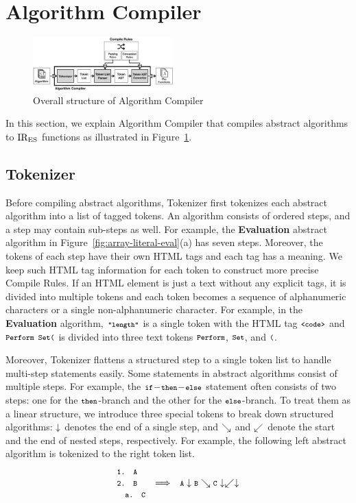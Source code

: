 \section{Algorithm Compiler}\label{sec:compiler}
\begin{figure}
  \centering
  \includegraphics[width=0.48\textwidth]{img/algo-compiler}
  \caption{Overall structure of {\sf Algorithm Compiler}}
  \label{fig:algo-compiler}
\end{figure}

In this section, we explain {\sf Algorithm Compiler} that compiles
abstract algorithms to \( \text{IR}_\text{ES} \) functions as illustrated in
Figure~\ref{fig:algo-compiler}.

\subsection{Tokenizer}
Before compiling abstract algorithms, {\sf Tokenizer} first tokenizes each
abstract algorithm into a list of tagged tokens.  An algorithm consists of
ordered steps, and a step may contain sub-steps as well.  For example, the
\textbf{\small Evaluation} abstract algorithm in
Figure~\ref{fig:array-literal-eval}(a) has seven steps.  Moreover, the tokens of
each step have their own HTML tags and each tag has a meaning.  We keep such
HTML tag information for each token to construct more precise {\sf Compile
Rules}. If an HTML element is just a text without any explicit tags, it is
divided into multiple tokens and each token becomes a sequence of alphanumeric
characters or a single non-alphanumeric character.  For example, in the
\textbf{\small Evaluation} algorithm, \( \textbf{\texttt{\footnotesize"length"}} \) is a single
token with the HTML tag \( \texttt{\footnotesize<code>} \) and \( \texttt{\footnotesize Perform Set(} \) is
divided into three text tokens \( \texttt{\footnotesize Perform} \), \( \texttt{\footnotesize Set} \), and \(
\texttt{\footnotesize(} \).

Moreover, {\sf Tokenizer} flattens a structured step to a single token
list to handle multi-step statements easily.  Some statements in
abstract algorithms consist of multiple steps.  For example, the
\( \texttt{\footnotesize if}\!-\!\texttt{\footnotesize then}\!-\!\texttt{\footnotesize else} \) statement often consists of
two steps: one for the \( \texttt{\footnotesize then} \)-branch and the other
for the \( \texttt{\footnotesize else} \)-branch.  To treat them as a linear structure,
we introduce three special tokens to break down structured algorithms:
\( \downarrow \) denotes the end of a single step, and \( \searrow \) and
\( \swarrow \) denote the start and the end of nested steps, respectively.
For example, the following left abstract algorithm is tokenized to the right
token list.
\[
  \begin{array}{lcl}
    \texttt{\footnotesize1. A}\\
    \texttt{\footnotesize2. B} &\Longrightarrow& \texttt{\footnotesize A} \downarrow \texttt{\footnotesize B} \searrow \texttt{\footnotesize C} \downarrow \swarrow \downarrow\\
    \texttt{\footnotesize\ \ a. C}\\
  \end{array}
\]

